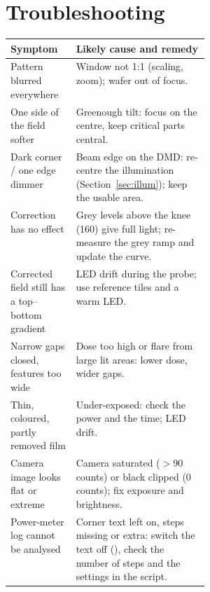 \documentclass[11pt,a4paper]{article}
\newcommand{\key}[1]{\fbox{\footnotesize\texttt{#1}}}
\begin{document}
\section{Troubleshooting}
\begin{table}[H]\centering\small
\begin{tabularx}{\linewidth}{@{}>{\raggedright\arraybackslash}p{0.33\linewidth}X@{}}
\toprule
Symptom & Likely cause and remedy \\
\midrule
Pattern blurred everywhere & Window not 1:1 (scaling, zoom); wafer out of focus. \\
One side of the field softer & Greenough tilt: focus on the centre, keep critical parts central. \\
Dark corner / one edge dimmer & Beam edge on the DMD: re-centre the illumination (Section~\ref{sec:illum}); keep the
                                usable area. \\
Correction has no effect & Grey levels above the knee (160) give full light; re-measure the grey ramp and update the
                           curve. \\
Corrected field still has a top--bottom gradient & LED drift during the probe; use reference tiles and a warm LED. \\
Narrow gaps closed, features too wide & Dose too high or flare from large lit areas: lower dose, wider gaps. \\
Thin, coloured, partly removed film & Under-exposed: check the power and the time; LED drift. \\
Camera image looks flat or extreme & Camera saturated ($>$90 counts) or black clipped (0 counts); fix exposure and
                                     brightness. \\
Power-meter log cannot be analysed & Corner text left on, steps missing or extra: switch the text off (\key{H}), check
                                     the number of steps and the settings in the script. \\
\bottomrule
\end{tabularx}
\end{table}

\appendix
\end{document}
